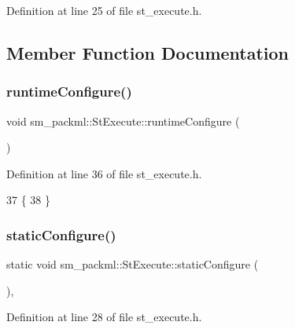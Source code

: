 Definition at line 25 of file st\+\_\+execute.\+h.



\subsection{Member Function Documentation}
\mbox{\label{structsm__packml_1_1StExecute_a6653ce8b5d8ffb94d146a804d5413b15}} 
\subsubsection{\texorpdfstring{runtime\+Configure()}{runtimeConfigure()}}
{\footnotesize\ttfamily void sm\+\_\+packml\+::\+St\+Execute\+::runtime\+Configure (\begin{DoxyParamCaption}{ }\end{DoxyParamCaption})\hspace{0.3cm}{\ttfamily [inline]}}



Definition at line 36 of file st\+\_\+execute.\+h.


\begin{DoxyCode}
37     \{
38     \}
\end{DoxyCode}
\mbox{\label{structsm__packml_1_1StExecute_ac4500ddafb5c02a0958cc5641ea2c80e}} 
\subsubsection{\texorpdfstring{static\+Configure()}{staticConfigure()}}
{\footnotesize\ttfamily static void sm\+\_\+packml\+::\+St\+Execute\+::static\+Configure (\begin{DoxyParamCaption}{ }\end{DoxyParamCaption})\hspace{0.3cm}{\ttfamily [inline]}, {\ttfamily [static]}}



Definition at line 28 of file st\+\_\+execute.\+h.


